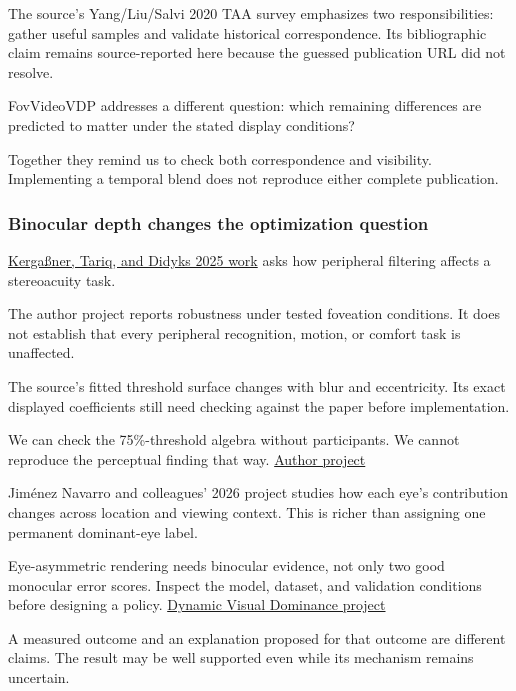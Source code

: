 The source's Yang/Liu/Salvi 2020 TAA survey emphasizes two responsibilities: gather useful samples and validate historical correspondence. Its bibliographic claim remains source-reported here because the guessed publication URL did not resolve.

FovVideoVDP addresses a different question: which remaining differences are predicted to matter under the stated display conditions?

Together they remind us to check both correspondence and visibility. Implementing a temporal blend does not reproduce either complete publication.

\subsubsection{Binocular depth changes the optimization question}\label{04-visual-computing-ii-ch043-binocular-depth-changes-the-optimization-question}

\hypertarget{04-visual-computing-ii-ch043-binocular-depth-changes-the-optimization-question}{}

\hyperref[appendix-8dc848f14052]{Kergaßner, Tariq, and Didyk\textquotesingle s 2025 work} asks how peripheral filtering affects a stereoacuity task.

The author project reports robustness under tested foveation conditions. It does not establish that every peripheral recognition, motion, or comfort task is unaffected.

The source's fitted threshold surface changes with blur and eccentricity. Its exact displayed coefficients still need checking against the paper before implementation.

We can check the 75\%-threshold algebra without participants. We cannot reproduce the perceptual finding that way. \href{https://sophie-kergassner.github.io/depth-in-periphery.html}{Author project}

Jiménez Navarro and colleagues' 2026 project studies how each eye's contribution changes across location and viewing context. This is richer than assigning one permanent dominant-eye label.

Eye-asymmetric rendering needs binocular evidence, not only two good monocular error scores. Inspect the model, dataset, and validation conditions before designing a policy. \href{https://dynamicvisualdominance.mpi-inf.mpg.de/}{Dynamic Visual Dominance project}

A measured outcome and an explanation proposed for that outcome are different claims. The result may be well supported even while its mechanism remains uncertain.

